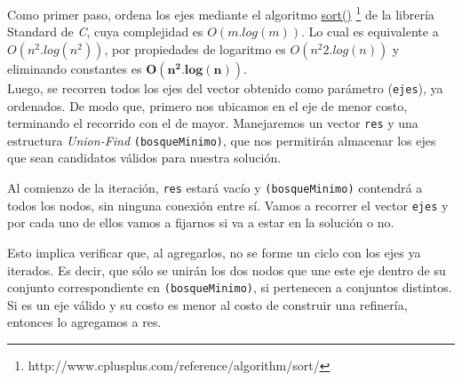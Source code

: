 Como primer paso, ordena los ejes mediante el algoritmo  \href{http://www.cplusplus.com/reference/algorithm/sort/}{sort()} \footnote{http://www.cplusplus.com/reference/algorithm/sort/} de la librer\'ia Standard de \emph{C}, cuya complejidad es $O(m.log(m))$. Lo cual es equivalente a $O(n^2.log(n^2))$, por propiedades de logaritmo es $O(n^{2}2.log(n))$ y eliminando constantes es $\mathbf{O(n^2.log(n))}$. \\


Luego, se recorren todos los ejes del vector obtenido como par\'ametro (\texttt{ejes}), ya ordenados. De modo que, primero nos ubicamos en el eje de menor costo, terminando el recorrido con el de mayor. Manejaremos un vector \texttt{res} y una estructura \emph{Union-Find} \texttt{(bosqueMinimo)}, que nos permitir\'an almacenar los ejes que sean candidatos v\'alidos para nuestra soluci\'on.

Al comienzo de la iteraci\'on, \texttt{res} estar\'a vac\'io y \texttt{(bosqueMinimo)} contendr\'a a todos los nodos, sin ninguna conexi\'on entre s\'i. Vamos a recorrer el vector \texttt{ejes} y por cada uno de ellos vamos a fijarnos si va a estar en la soluci\'on o no.

Esto implica verificar que, al agregarlos, no se forme un ciclo con los ejes ya iterados. Es decir, que s\'olo se unir\'an los dos nodos que une este eje dentro de su conjunto correspondiente en \texttt{(bosqueMinimo)}, si pertenecen a conjuntos distintos. Si es un eje v\'alido y su costo es menor al costo de construir una refiner\'ia, entonces lo agregamos a res.\\


